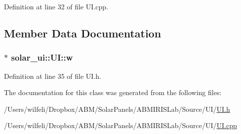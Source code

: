 Definition at line 32 of file U\+I.\+cpp.



\subsection{Member Data Documentation}
\hypertarget{classsolar__ui_1_1_u_i_af3bb455922ee0b7b8e3dbe613cd37be5}{}
\subsubsection[{w}]{$\ast$ solar\+\_\+ui\+::\+U\+I\+::w\hspace{0.3cm}{\ttfamily [protected]}}\label{classsolar__ui_1_1_u_i_af3bb455922ee0b7b8e3dbe613cd37be5}


Definition at line 35 of file U\+I.\+h.



The documentation for this class was generated from the following files\+:\begin{DoxyCompactItemize}
\item 
/\+Users/wilfeli/\+Dropbox/\+A\+B\+M/\+Solar\+Panels/\+A\+B\+M\+I\+R\+I\+S\+Lab/\+Source/\+U\+I/\hyperlink{_u_i_8h}{U\+I.\+h}\item 
/\+Users/wilfeli/\+Dropbox/\+A\+B\+M/\+Solar\+Panels/\+A\+B\+M\+I\+R\+I\+S\+Lab/\+Source/\+U\+I/\hyperlink{_u_i_8cpp}{U\+I.\+cpp}\end{DoxyCompactItemize}
